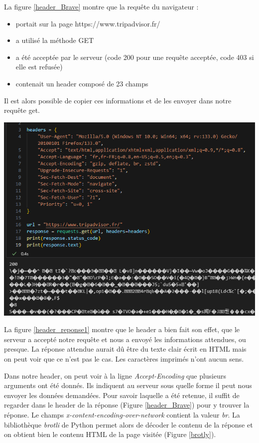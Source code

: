 La figure \ref{header_Brave} montre que la requête du navigateur :
\begin{itemize}
\item portait sur la page https://www.tripadvisor.fr/
\item a utilisé la méthode GET
\item a été acceptée par le serveur (code 200 pour une requête acceptée, code 403 si elle est refusée)
\item contenait un header composé de 23 champs
\end{itemize}

Il est alors possible de copier ces informations et de les envoyer dans notre requête get.

\begin{center}
\includegraphics[scale=0.5]{Images/header2.png}
\label{header_reponse1}
\end{center}

La figure \ref{header_reponse1} montre que le header a bien fait son effet, que le serveur a accepté notre requête et nous a envoyé les informations attendues, ou presque. La réponse attendue aurait dû être du texte clair écrit en HTML mais on peut voir que ce n'est pas le cas. Les caractères imprimés n'ont aucun sens.

Dans notre header, on peut voir à la ligne \textit{Accept-Encoding} que plusieurs arguments ont été donnés. Ils indiquent au serveur sous quelle forme il peut nous envoyer les données demandées. Pour savoir laquelle a été retenue, il suffit de regarder dans le header de la réponse (Figure \ref{header_Brave}) pour y trouver la réponse. Le champs \textit{x-content-encoding-over-network} contient la valeur \textit{br}. La bibliothèque \textit{brotli} de Python permet alors de décoder le contenu de la réponse et on obtient bien le contenu HTML de la page visitée (Figure \ref{brotly}).

